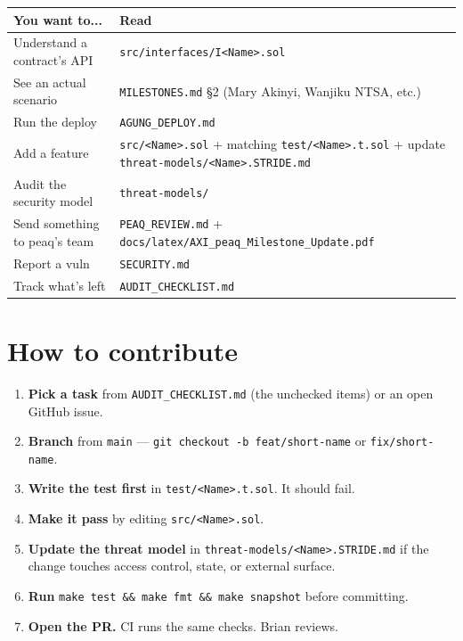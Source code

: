 \documentclass[11pt,a4paper]{article}
\begin{document}
\begin{center}
\begin{tabular}{p{6cm} p{9.5cm}}
\toprule
{\bfseries\color{axiprimary}You want to...} & {\bfseries\color{axiprimary}Read} \\
\midrule
Understand a contract's API & \texttt{src/interfaces/I<Name>.sol} \\
\addlinespace[2pt]
See an actual scenario & \texttt{MILESTONES.md} \S 2 (Mary Akinyi, Wanjiku NTSA, etc.) \\
\addlinespace[2pt]
Run the deploy & \texttt{AGUNG\_DEPLOY.md} \\
\addlinespace[2pt]
Add a feature & \texttt{src/<Name>.sol} + matching \texttt{test/<Name>.t.sol} + update \texttt{threat-models/<Name>.STRIDE.md} \\
\addlinespace[2pt]
Audit the security model & \texttt{threat-models/} \\
\addlinespace[2pt]
Send something to peaq's team & \texttt{PEAQ\_REVIEW.md} + \texttt{docs/latex/AXI\_peaq\_Milestone\_Update.pdf} \\
\addlinespace[2pt]
Report a vuln & \texttt{SECURITY.md} \\
\addlinespace[2pt]
Track what's left & \texttt{AUDIT\_CHECKLIST.md} \\
\bottomrule
\end{tabular}
\end{center}

\section{How to contribute}

\begin{enumerate}[leftmargin=*]
  \item \textbf{Pick a task} from \texttt{AUDIT\_CHECKLIST.md} (the unchecked items) or an open GitHub issue.
  \item \textbf{Branch} from \texttt{main} --- \texttt{git checkout -b feat/short-name} or \texttt{fix/short-name}.
  \item \textbf{Write the test first} in \texttt{test/<Name>.t.sol}. It should fail.
  \item \textbf{Make it pass} by editing \texttt{src/<Name>.sol}.
  \item \textbf{Update the threat model} in \texttt{threat-models/<Name>.STRIDE.md} if the change touches access control, state, or external surface.
  \item \textbf{Run} \texttt{make test \&\& make fmt \&\& make snapshot} before committing.
  \item \textbf{Open the PR.} CI runs the same checks. Brian reviews.
\end{enumerate}
\end{document}
